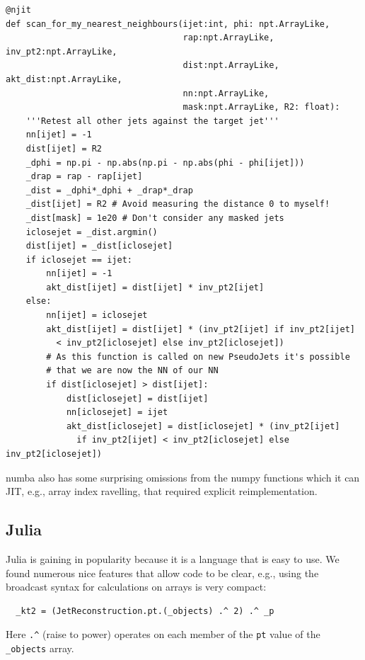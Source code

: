 \documentclass{webofc}
\begin{document}
\begin{verbatim}
@njit
def scan_for_my_nearest_neighbours(ijet:int, phi: npt.ArrayLike, 
                                   rap:npt.ArrayLike, inv_pt2:npt.ArrayLike, 
                                   dist:npt.ArrayLike, akt_dist:npt.ArrayLike, 
                                   nn:npt.ArrayLike, 
                                   mask:npt.ArrayLike, R2: float):
    '''Retest all other jets against the target jet'''
    nn[ijet] = -1
    dist[ijet] = R2
    _dphi = np.pi - np.abs(np.pi - np.abs(phi - phi[ijet]))
    _drap = rap - rap[ijet]
    _dist = _dphi*_dphi + _drap*_drap
    _dist[ijet] = R2 # Avoid measuring the distance 0 to myself!
    _dist[mask] = 1e20 # Don't consider any masked jets
    iclosejet = _dist.argmin()
    dist[ijet] = _dist[iclosejet]
    if iclosejet == ijet:
        nn[ijet] = -1
        akt_dist[ijet] = dist[ijet] * inv_pt2[ijet]
    else:
        nn[ijet] = iclosejet
        akt_dist[ijet] = dist[ijet] * (inv_pt2[ijet] if inv_pt2[ijet] 
          < inv_pt2[iclosejet] else inv_pt2[iclosejet])
        # As this function is called on new PseudoJets it's possible
        # that we are now the NN of our NN
        if dist[iclosejet] > dist[ijet]:
            dist[iclosejet] = dist[ijet]
            nn[iclosejet] = ijet
            akt_dist[iclosejet] = dist[iclosejet] * (inv_pt2[ijet] 
              if inv_pt2[ijet] < inv_pt2[iclosejet] else inv_pt2[iclosejet])
\end{verbatim}

numba also has some surprising omissions from the numpy functions which it can
JIT, e.g., array index ravelling, that required explicit reimplementation.

\subsection{Julia}
\label{sec:julia-ergonomics}

Julia is gaining in popularity because it is a language that is easy to use.
We found numerous nice features that allow code to be clear, e.g., using the
broadcast syntax for calculations on arrays is very compact:

\begin{verbatim}
  _kt2 = (JetReconstruction.pt.(_objects) .^ 2) .^ _p
\end{verbatim}

Here \texttt{.\^} (raise to power) operates on each member of the \texttt{pt}
value of the \texttt{\_objects} array.
\end{document}
